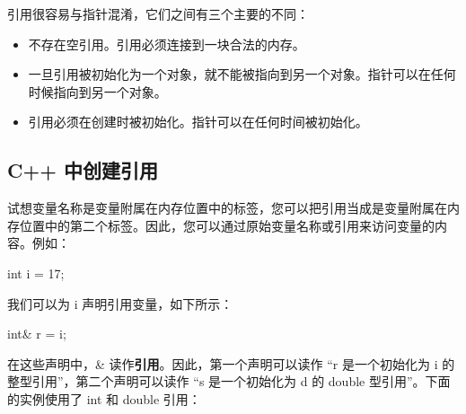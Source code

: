 \documentclass[
]{article}
\newenvironment{Shaded}{}{}
\newcommand{\DataTypeTok}[1]{\textcolor[rgb]{0.56,0.13,0.00}{#1}}
\newcommand{\DecValTok}[1]{\textcolor[rgb]{0.25,0.63,0.44}{#1}}
\newcommand{\NormalTok}[1]{#1}
\newcommand{\OperatorTok}[1]{\textcolor[rgb]{0.40,0.40,0.40}{#1}}
\providecommand{\tightlist}{%
  \setlength{\itemsep}{0pt}\setlength{\parskip}{0pt}}
\begin{document}
引用很容易与指针混淆，它们之间有三个主要的不同：

\begin{itemize}
\tightlist
\item
  不存在空引用。引用必须连接到一块合法的内存。
\item
  一旦引用被初始化为一个对象，就不能被指向到另一个对象。指针可以在任何时候指向到另一个对象。
\item
  引用必须在创建时被初始化。指针可以在任何时间被初始化。
\end{itemize}

\hypertarget{c-ux4e2dux521bux5efaux5f15ux7528}{%
\subsection{C++ 中创建引用}\label{c-ux4e2dux521bux5efaux5f15ux7528}}

试想变量名称是变量附属在内存位置中的标签，您可以把引用当成是变量附属在内存位置中的第二个标签。因此，您可以通过原始变量名称或引用来访问变量的内容。例如：

\begin{Shaded}
\begin{Highlighting}[]
\DataTypeTok{int}\NormalTok{ i }\OperatorTok{=} \DecValTok{17}\OperatorTok{;}
\end{Highlighting}
\end{Shaded}

我们可以为 i 声明引用变量，如下所示：

\begin{Shaded}
\begin{Highlighting}[]
\DataTypeTok{int}\OperatorTok{\&}\NormalTok{    r }\OperatorTok{=}\NormalTok{ i}\OperatorTok{;}
\end{Highlighting}
\end{Shaded}

在这些声明中，\& 读作\textbf{引用}。因此，第一个声明可以读作 ``r
是一个初始化为 i 的整型引用''，第二个声明可以读作 ``s 是一个初始化为 d
的 double 型引用''。下面的实例使用了 int 和 double 引用：
\end{document}
